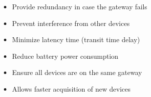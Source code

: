 \begin{itemize}
\item{} Provide redundancy in case the gateway fails
\vskip 5pt 
\item{} Prevent interference from other devices
\vskip 5pt 
\item{} Minimize latency time (transit time delay) 
\vskip 5pt 
\item{} Reduce battery power consumption
\vskip 5pt 
\item{} Ensure all devices are on the same gateway
\vskip 5pt 
\item{} Allows faster acquisition of new devices
\end{itemize}




